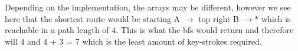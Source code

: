 \documentclass[12pt]{article}
\begin{document}
Depending on the implementation, the arrays may be different, however we see here that the shortest route
would be starting A $\rightarrow$ top right B $\rightarrow \ast$ which is reachable in a path length of 4.
This is what the bfs would return and therefore will 4 and 4 + 3 = 7 which is the least amount of
key-strokes  required.

\end{document}
